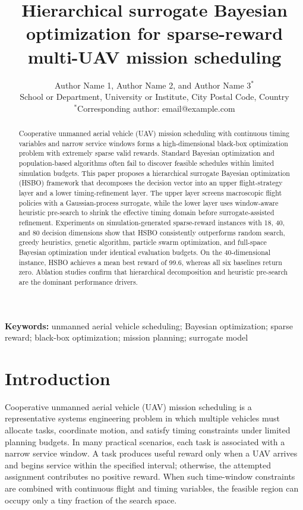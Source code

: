 \documentclass[twocolumn]{article}
\title{Hierarchical surrogate Bayesian optimization for sparse-reward multi-UAV mission scheduling}
\author{Author Name 1, Author Name 2, and Author Name 3$^{*}$\\
\small School or Department, University or Institute, City Postal Code, Country\\
\small $^{*}$Corresponding author: email@example.com}
\date{}
\begin{document}
\maketitle

\begin{abstract}
Cooperative unmanned aerial vehicle (UAV) mission scheduling with continuous timing variables and narrow service windows forms a high-dimensional black-box optimization problem with extremely sparse valid rewards. Standard Bayesian optimization and population-based algorithms often fail to discover feasible schedules within limited simulation budgets. This paper proposes a hierarchical surrogate Bayesian optimization (HSBO) framework that decomposes the decision vector into an upper flight-strategy layer and a lower timing-refinement layer. The upper layer screens macroscopic flight policies with a Gaussian-process surrogate, while the lower layer uses window-aware heuristic pre-search to shrink the effective timing domain before surrogate-assisted refinement. Experiments on simulation-generated sparse-reward instances with 18, 40, and 80 decision dimensions show that HSBO consistently outperforms random search, greedy heuristics, genetic algorithm, particle swarm optimization, and full-space Bayesian optimization under identical evaluation budgets. On the 40-dimensional instance, HSBO achieves a mean best reward of 99.6, whereas all six baselines return zero. Ablation studies confirm that hierarchical decomposition and heuristic pre-search are the dominant performance drivers.
\end{abstract}

\noindent\textbf{Keywords:} unmanned aerial vehicle scheduling; Bayesian optimization; sparse reward; black-box optimization; mission planning; surrogate model

\section{Introduction}
Cooperative unmanned aerial vehicle (UAV) mission scheduling is a representative systems engineering problem in which multiple vehicles must allocate tasks, coordinate motion, and satisfy timing constraints under limited planning budgets. In many practical scenarios, each task is associated with a narrow service window. A task produces useful reward only when a UAV arrives and begins service within the specified interval; otherwise, the attempted assignment contributes no positive reward. When such time-window constraints are combined with continuous flight and timing variables, the feasible region can occupy only a tiny fraction of the search space.
\end{document}
